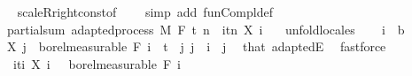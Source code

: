 \begin{isabellebody}
\isadelimproof
\ %
\endisadelimproof
%
\isatagproof
{}\isamarkupfalse%
\ scaleR{\isacharunderscore}{\kern0pt}right{\isacharunderscore}{\kern0pt}const{\isacharbrackleft}{\kern0pt}of\ {\isachardoublequoteopen}{\isasymlambda}{\isacharunderscore}{\kern0pt}{\isachardot}{\kern0pt}\ {\isacharminus}{\kern0pt}{}{\isachardoublequoteclose}{\isacharbrackright}{\kern0pt}\ \isamarkupfalse%
\ {\isacharparenleft}{\kern0pt}simp\ add{\isacharcolon}{\kern0pt}\ fun{\isacharunderscore}{\kern0pt}Compl{\isacharunderscore}{\kern0pt}def{\isacharparenright}{\kern0pt}%
\endisatagproof
{\isafoldproof}%
%
\isadelimproof
%
\endisadelimproof
\isanewline
\isanewline
{}\isamarkupfalse%
\ partial{\isacharunderscore}{\kern0pt}sum{\isacharcolon}{\kern0pt}\ {\isachardoublequoteopen}adapted{\isacharunderscore}{\kern0pt}process\ M\ F\ t\ {\isacharparenleft}{\kern0pt}{\isasymlambda}n\ {\isasymxi}{\isachardot}{\kern0pt}\ {\isasymSum}i{\isasymin}{\isacharbraceleft}{\kern0pt}tn{\isacharbraceright}{\kern0pt}{\isachardot}{\kern0pt}\ X\ i\ {\isasymxi}{\isacharparenright}{\kern0pt}{\isachardoublequoteclose}\ \isanewline
%
\isadelimproof
%
\endisadelimproof
%
\isatagproof
{}\isamarkupfalse%
\ {\isacharparenleft}{\kern0pt}unfold{\isacharunderscore}{\kern0pt}locales{\isacharparenright}{\kern0pt}\isanewline
\ \ \isamarkupfalse%
\ i\ {\isacharcolon}{\kern0pt}{\isacharcolon}{\kern0pt}\ {\isacharprime}{\kern0pt}b\isanewline
\ \ \isamarkupfalse%
\ {\isachardoublequoteopen}X\ j\ {\isasymin}\ borel{\isacharunderscore}{\kern0pt}measurable\ {\isacharparenleft}{\kern0pt}F\ i{\isacharparenright}{\kern0pt}{\isachardoublequoteclose}\ \ {\isachardoublequoteopen}t\ {\isasymle}\ j{\isachardoublequoteclose}\ {\isachardoublequoteopen}j\ {\isacharless}{\kern0pt}\ i{\isachardoublequoteclose}\ \ j\ \isamarkupfalse%
\ that\ adaptedE\ \isamarkupfalse%
\ fastforce\isanewline
\ \ \isamarkupfalse%
\ {\isachardoublequoteopen}{\isacharparenleft}{\kern0pt}{\isasymlambda}{\isasymxi}{\isachardot}{\kern0pt}\ {\isasymSum}i{\isasymin}{\isacharbraceleft}{\kern0pt}ti{\isacharbraceright}{\kern0pt}{\isachardot}{\kern0pt}\ X\ i\ {\isasymxi}{\isacharparenright}{\kern0pt}\ {\isasymin}\ borel{\isacharunderscore}{\kern0pt}measurable\ {\isacharparenleft}{\kern0pt}F\ i{\isacharparenright}{\kern0pt}{\isachardoublequoteclose}\ \isamarkupfalse%

\end{isabellebody}
